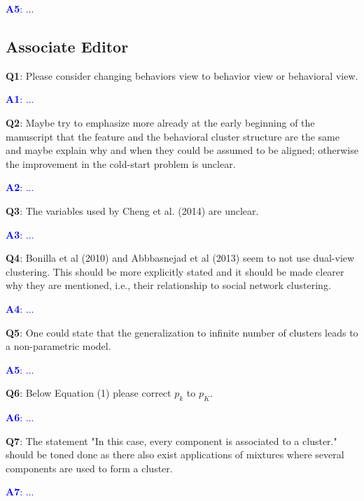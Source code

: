 \documentclass[]{article}
\begin{document}
		\textcolor{blue}{  \textbf{A5}: ...} 
	

	\vspace{3mm}
	
	
	\subsection*{Associate Editor}
	\textbf{Q1}: Please consider changing behaviors view to behavior view or behavioral view.
	
		\textcolor{blue}{  \textbf{A1}: ...} 

	
	\vspace{3mm}
	\textbf{Q2}: Maybe try to emphasize more already at the early beginning of the manuscript that the feature and the behavioral cluster structure are the same and maybe explain why and when they could be assumed to be aligned; otherwise the improvement in the cold-start problem is unclear.

	\textcolor{blue}{  
	\textbf{A2}: ...
	} 

	\vspace{3mm}
	\textbf{Q3}: The variables used by Cheng et al. (2014) are unclear.

	\textcolor{blue}{  
	\textbf{A3}: ...
	} 
	
		
	\vspace{3mm}
	\textbf{Q4}: Bonilla et al (2010) and Abbbasnejad et al (2013) seem to not use dual-view clustering. This should be more explicitly stated and it should be made clearer why they are mentioned, i.e., their relationship to social network clustering.
	
	\textcolor{blue}{  
	\textbf{A4}: ...
	} 
	
		\vspace{3mm}
	\textbf{Q5}:  One could state that the generalization to infinite number of clusters leads to a non-parametric model.

	\textcolor{blue}{  
	\textbf{A5}: ...
	} 

		\vspace{3mm}
	\textbf{Q6}:  Below Equation (1) please correct $p_k$ to $p_K$.

	\textcolor{blue}{  
	\textbf{A6}: ...
	} 

		\vspace{3mm}
	\textbf{Q7}:  The statement "In this case, every component is associated to a cluster." should be toned done as there also exist applications of mixtures where several components are used to form a cluster.
	
	\textcolor{blue}{  
	\textbf{A7}: ...
	} 
	
\end{document}
